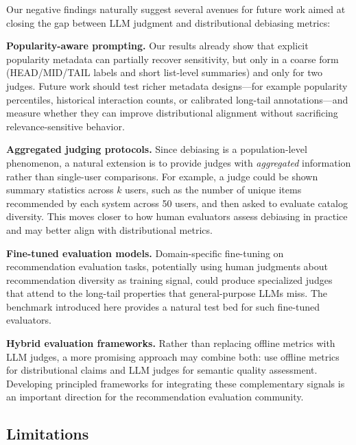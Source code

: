 \documentclass[pdflatex,sn-basic,referee,lineno]{sn-jnl}
\begin{document}
Our negative findings naturally suggest several avenues for future work aimed at closing the gap between LLM judgment and distributional debiasing metrics:

\noindent\textbf{Popularity-aware prompting.}  Our results already show that explicit popularity metadata can partially recover sensitivity, but only in a coarse form (HEAD/MID/TAIL labels and short list-level summaries) and only for two judges. Future work should test richer metadata designs---for example popularity percentiles, historical interaction counts, or calibrated long-tail annotations---and measure whether they can improve distributional alignment without sacrificing relevance-sensitive behavior.

\noindent\textbf{Aggregated judging protocols.}  Since debiasing is a population-level phenomenon, a natural extension is to provide judges with \emph{aggregated} information rather than single-user comparisons. For example, a judge could be shown summary statistics across $k$ users, such as the number of unique items recommended by each system across 50 users, and then asked to evaluate catalog diversity. This moves closer to how human evaluators assess debiasing in practice and may better align with distributional metrics.

\noindent\textbf{Fine-tuned evaluation models.}  Domain-specific fine-tuning on recommendation evaluation tasks, potentially using human judgments about recommendation diversity as training signal, could produce specialized judges that attend to the long-tail properties that general-purpose LLMs miss. The benchmark introduced here provides a natural test bed for such fine-tuned evaluators.

\noindent\textbf{Hybrid evaluation frameworks.}  Rather than replacing offline metrics with LLM judges, a more promising approach may combine both: use offline metrics for distributional claims and LLM judges for semantic quality assessment. Developing principled frameworks for integrating these complementary signals is an important direction for the recommendation evaluation community.

\subsection{Limitations}
\end{document}
